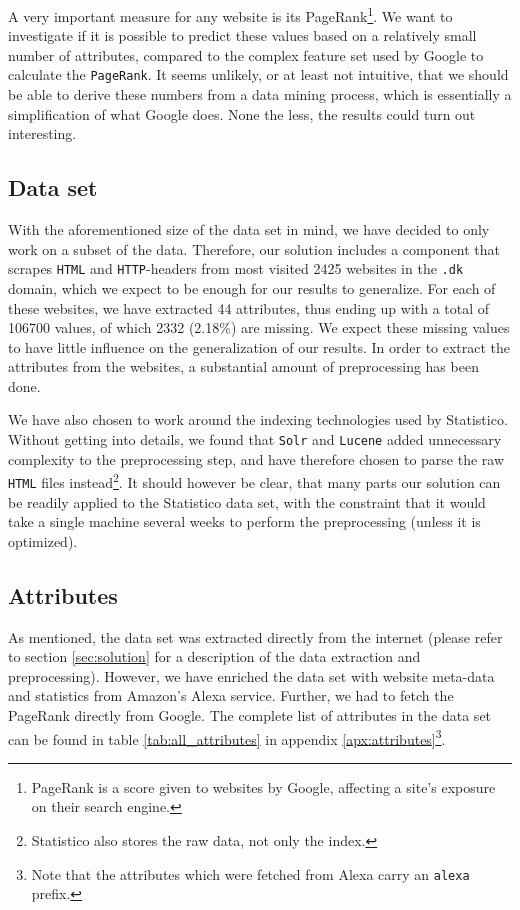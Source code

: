 A very important measure for any website is its PageRank\footnote{PageRank is a score given to websites by Google, affecting a site's exposure on their search engine.}. We want to investigate if it is possible to predict these values based on a relatively small number of attributes, compared to the complex feature set used by Google to calculate the \texttt{PageRank}. It seems unlikely, or at least not intuitive, that we should be able to derive these numbers from a data mining process, which is essentially a simplification of what Google does. None the less, the results could turn out interesting.

\subsection{Data set}
\label{subsec:data_set}

With the aforementioned size of the data set in mind, we have decided to only work on a subset of the data. Therefore, our solution includes a component that scrapes \texttt{HTML} and \texttt{HTTP}-headers from most visited 2425 websites in the \texttt{.dk} domain, which we expect to be enough for our results to generalize. For each of these websites, we have extracted 44 attributes, thus ending up with a total of 106700 values, of which 2332 (2.18\%) are missing. We expect these missing values to have little influence on the generalization of our results. In order to extract the attributes from the websites, a substantial amount of preprocessing has been done. 

We have also chosen to work around the indexing technologies used by Statistico. Without getting into details, we found that \texttt{Solr} and \texttt{Lucene} added unnecessary complexity to the preprocessing step, and have therefore chosen to parse the raw \texttt{HTML} files instead\footnote{Statistico also stores the raw data, not only the index.}. It should however be clear, that many parts our solution can be readily applied to the Statistico data set, with the constraint that it would take a single machine several weeks to perform the preprocessing (unless it is optimized).

\subsection{Attributes}
\label{subsec:attributes}

As mentioned, the data set was extracted directly from the internet (please refer to section \ref{sec:solution} for a description of the data extraction and preprocessing). However, we have enriched the data set with website meta-data and statistics from Amazon's Alexa\cite{alexa} service. Further, we had to fetch the PageRank directly from Google. The complete list of attributes in the data set can be found in table \ref{tab:all_attributes} in appendix \ref{apx:attributes}\footnote{Note that the attributes which were fetched from Alexa carry an \texttt{alexa} prefix.}.

